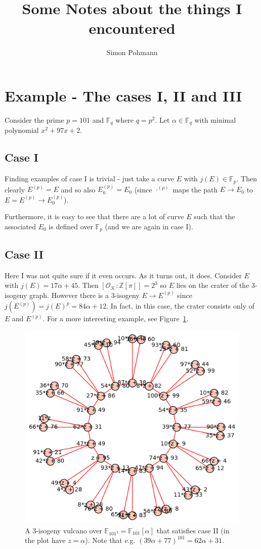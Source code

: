 \documentclass{scrartcl}
\title{Some Notes about the things I encountered}
\author{Simon Pohmann}
\newcommand{\Z}{\mathbb{Z}}
\newcommand{\F}{\mathbb{F}}
\newcommand{\K}{\mathcal{K}}
\renewcommand{\O}{\mathcal{O}}
\theoremstyle{definition}
\begin{document}
\maketitle

\section{Example - The cases I, II and III}
Consider the prime $p = 101$ and $\F_q$ where $q = p^2$.
Let $\alpha \in \F_q$ with minimal polynomial $x^2 + 97 x + 2$.

\subsection{Case I}
Finding examples of case I is trivial - just take a curve $E$ with $j(E) \in \F_p$.
Then clearly $E^{(p)} = E$ and so also $E_0^{(p)} = E_0$ (since $\cdot^{(p)}$ maps the path $E \to E_0$ to $E = E^{(p)} \to E_0^{(p)}$).

Furthermore, it is easy to see that there are a lot of curve $E$ such that the associated $E_0$ is defined over $\F_p$ (and we are again in case I).

\subsection{Case II}
Here I was not quite sure if it even occurs. As it turns out, it does.
Consider $E$ with $j(E) = 17\alpha + 45$.
Then $[\O_\K : \Z[\pi]] = 2^3$ so $E$ lies on the crater of the 3-isogeny graph.
However there is a 3-isogeny $E \to E^{(p)}$ since $j(E^{(p)}) = j(E)^p = 84 \alpha + 12$.
In fact, in this case, the crater consists only of $E$ and $E^{(p)}$.
For a more interesting example, see Figure~\ref{fig:example_II}.
\begin{figure}
    \includegraphics{./example_II.png}
    \caption{\label{fig:example_II} A 3-isogeny vulcano over $\F_{101^2} = \F_{101}[\alpha]$ that satisfies case II (in the plot have $z = \alpha$). Note that e.g. $(39\alpha + 77)^{101} = 62\alpha + 31$.}
\end{figure}
\end{document}
